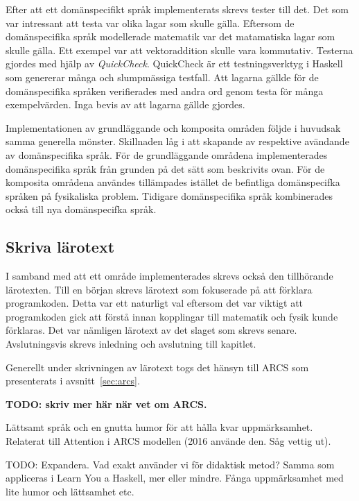 \begin{draft}
Efter att ett domänspecifikt språk implementerats skrevs tester till det. Det som var intressant att testa var olika lagar som skulle gälla. Eftersom de domänspecifika språk modellerade matematik var det matamatiska lagar som skulle gälla. Ett exempel var att vektoraddition skulle vara kommutativ. Testerna gjordes med hjälp av \textit{QuickCheck}. QuickCheck är ett testningsverktyg i Haskell som genererar många och slumpmässiga testfall. Att lagarna gällde för de domänspecifika språken verifierades med andra ord genom testa för många exempelvärden. Inga bevis av att lagarna gällde gjordes.

Implementationen av grundläggande och komposita områden följde i huvudsak samma generella mönster. Skillnaden låg i att skapande av respektive avändande av domänspecifika språk. För de grundläggande områdena implementerades domänspecifika språk från grunden på det sätt som beskrivits ovan. För de komposita områdena användes tillämpades istället de befintliga domänspecifka språken på fysikaliska problem. Tidigare domänspecifika språk kombinerades också till nya domänspecifka språk.

\subsection{Skriva lärotext}

I samband med att ett område implementerades skrevs också den tillhörande
lärotexten. Till en början skrevs lärotext som fokuserade på att förklara
programkoden. Detta var ett naturligt val eftersom det var viktigt att
programkoden gick att förstå innan kopplingar till matematik och fysik kunde
förklaras. Det var nämligen lärotext av det slaget som skrevs senare.
Avslutningsvis skrevs inledning och avslutning till kapitlet.

\end{draft}
\begin{binge}

Generellt under skrivningen av lärotext togs det hänsyn till ARCS som
presenterats i avsnitt~\ref{sec:arcs}. 

\textbf{TODO: skriv mer här när vet om ARCS.}

Lättsamt språk och en gnutta humor för att hålla kvar
uppmärksamhet. Relaterat till Attention i ARCS modellen (2016
använde den. Såg vettig ut).

TODO: Expandera. Vad exakt använder vi för didaktisk metod? Samma
som appliceras i Learn You a Haskell, mer eller mindre. Fånga
uppmärksamhet med lite humor och lättsamhet etc.

\end{binge}
